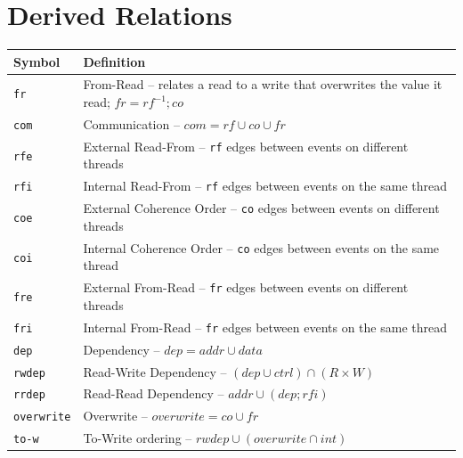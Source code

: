 \section*{Derived Relations}
\begin{longtable}{p{2.5cm}p{8cm}}
    \toprule
    Symbol & Definition \\
    \midrule\endhead
    \texttt{fr}                      & From-Read -- relates a read to a write that overwrites the value it read; $\mathit{fr} = \mathit{rf}^{-1} \mathbin{;} \mathit{co}$ \\
    \midrule
    \texttt{com}                     & Communication -- $\mathit{com} = \mathit{rf} \cup \mathit{co} \cup \mathit{fr}$ \\
    \midrule
    \texttt{rfe}                     & External Read-From -- \texttt{rf} edges between events on different threads \\
    \midrule
    \texttt{rfi}                     & Internal Read-From -- \texttt{rf} edges between events on the same thread \\
    \midrule
    \texttt{coe}                     & External Coherence Order -- \texttt{co} edges between events on different threads \\
    \midrule
    \texttt{coi}                     & Internal Coherence Order -- \texttt{co} edges between events on the same thread \\
    \midrule
    \texttt{fre}                     & External From-Read -- \texttt{fr} edges between events on different threads \\
    \midrule
    \texttt{fri}                     & Internal From-Read -- \texttt{fr} edges between events on the same thread \\
    \midrule
    \texttt{dep}                     & Dependency -- $\mathit{dep} = \mathit{addr} \cup \mathit{data}$ \\
    \midrule
    \texttt{rwdep}                   & Read-Write Dependency -- $(\mathit{dep} \cup \mathit{ctrl}) \cap (R \times W)$ \\
    \midrule
    \texttt{rrdep}                   & Read-Read Dependency -- $\mathit{addr} \cup (\mathit{dep} \mathbin{;} \mathit{rfi})$ \\
    \midrule
    \texttt{overwrite}               & Overwrite -- $\mathit{overwrite} = \mathit{co} \cup \mathit{fr}$ \\
    \midrule
    \texttt{to-w}             & To-Write ordering -- $\mathit{rwdep} \cup (\mathit{overwrite} \cap \mathit{int})$ \\

\end{longtable}
